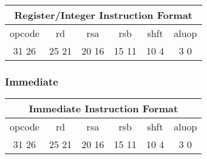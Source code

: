 \documentclass[letterpaper, 11pt]{article}
\begin{document}
\begin{center}
		\begin{tabular}{|c|c|c|c|c|c|}
			\multicolumn{6}{c}{Register/Integer Instruction Format}\\ \hline
				\hspace{2pt} opcode \hspace{2pt} & \hspace{5pt} rd \hspace{5pt} &  \hspace{4pt} rsa \hspace{4pt} & \hspace{4pt}rsb  \hspace{4pt}& \hspace{10pt}shft  \hspace{10pt} & \hspace{3pt} aluop \hspace{3pt}   \\	\hline
			31 \hfill 26& 25 \hfill 21 &20 \hfill  16& 15 \hfill  11&10 \hfill   4&3 \hfill   0\\ \hline
		
	\end{tabular}
\end{center}	




\subsubsection{Immediate}

\begin{center}
		\begin{tabular}{|c|c|c|c|c|c|}
			\multicolumn{6}{c}{Immediate Instruction Format}\\ \hline
				\hspace{2pt} opcode \hspace{2pt} & \hspace{5pt} rd \hspace{5pt} &  \hspace{4pt} rsa \hspace{4pt} & \hspace{4pt}rsb  \hspace{4pt}& \hspace{10pt}shft  \hspace{10pt} & \hspace{3pt} aluop \hspace{3pt}   \\	\hline
			31 \hfill 26& 25 \hfill 21 &20 \hfill  16& 15 \hfill  11&10 \hfill   4&3 \hfill   0\\ \hline
		
	\end{tabular}
\end{center}
\end{document}
